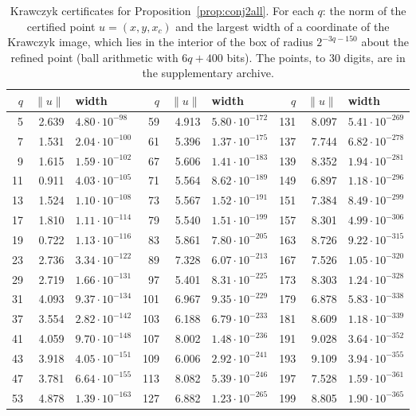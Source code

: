 \documentclass[11pt,reqno]{amsart}
\theoremstyle{definition}
\theoremstyle{remark}
\begin{document}
\begin{table}[ht]
\centering\scriptsize
\begin{tabular}{@{}rrl@{\hspace{1.4em}}rrl@{\hspace{1.4em}}rrl@{}}
\toprule
$q$ & $\|u\|$ & width & $q$ & $\|u\|$ & width & $q$ & $\|u\|$ & width\\
\midrule
5 & 2.639 & $4.80\cdot10^{-98}$ & 59 & 4.913 & $5.80\cdot10^{-172}$ & 131 & 8.097 & $5.41\cdot10^{-269}$ \\
7 & 1.531 & $2.04\cdot10^{-100}$ & 61 & 5.396 & $1.37\cdot10^{-175}$ & 137 & 7.744 & $6.82\cdot10^{-278}$ \\
9 & 1.615 & $1.59\cdot10^{-102}$ & 67 & 5.606 & $1.41\cdot10^{-183}$ & 139 & 8.352 & $1.94\cdot10^{-281}$ \\
11 & 0.911 & $4.03\cdot10^{-105}$ & 71 & 5.564 & $8.62\cdot10^{-189}$ & 149 & 6.897 & $1.18\cdot10^{-296}$ \\
13 & 1.524 & $1.10\cdot10^{-108}$ & 73 & 5.567 & $1.52\cdot10^{-191}$ & 151 & 7.384 & $8.49\cdot10^{-299}$ \\
17 & 1.810 & $1.11\cdot10^{-114}$ & 79 & 5.540 & $1.51\cdot10^{-199}$ & 157 & 8.301 & $4.99\cdot10^{-306}$ \\
19 & 0.722 & $1.13\cdot10^{-116}$ & 83 & 5.861 & $7.80\cdot10^{-205}$ & 163 & 8.726 & $9.22\cdot10^{-315}$ \\
23 & 2.736 & $3.34\cdot10^{-122}$ & 89 & 7.328 & $6.07\cdot10^{-213}$ & 167 & 7.526 & $1.05\cdot10^{-320}$ \\
29 & 2.719 & $1.66\cdot10^{-131}$ & 97 & 5.401 & $8.31\cdot10^{-225}$ & 173 & 8.303 & $1.24\cdot10^{-328}$ \\
31 & 4.093 & $9.37\cdot10^{-134}$ & 101 & 6.967 & $9.35\cdot10^{-229}$ & 179 & 6.878 & $5.83\cdot10^{-338}$ \\
37 & 3.554 & $2.82\cdot10^{-142}$ & 103 & 6.188 & $6.79\cdot10^{-233}$ & 181 & 8.609 & $1.18\cdot10^{-339}$ \\
41 & 4.059 & $9.70\cdot10^{-148}$ & 107 & 8.002 & $1.48\cdot10^{-236}$ & 191 & 9.028 & $3.64\cdot10^{-352}$ \\
43 & 3.918 & $4.05\cdot10^{-151}$ & 109 & 6.006 & $2.92\cdot10^{-241}$ & 193 & 9.109 & $3.94\cdot10^{-355}$ \\
47 & 3.781 & $6.64\cdot10^{-155}$ & 113 & 8.082 & $5.39\cdot10^{-246}$ & 197 & 7.528 & $1.59\cdot10^{-361}$ \\
53 & 4.878 & $1.39\cdot10^{-163}$ & 127 & 6.882 & $1.23\cdot10^{-265}$ & 199 & 8.805 & $1.90\cdot10^{-365}$ \\
\bottomrule
\end{tabular}
\caption{Krawczyk certificates for Proposition~\ref{prop:conj2all}.  For each
$q$: the norm of the certified point $u=(x,y,x_c)$ and the largest width of a
coordinate of the Krawczyk image, which lies in the interior of the box of
radius $2^{-3q-150}$ about the refined point (ball arithmetic with $6q+400$
bits).  The points, to $30$ digits, are in the supplementary archive.}\label{tab:krawczyk}
\end{table}
\end{document}
